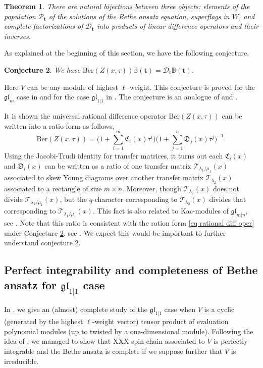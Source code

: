 \documentclass[11pt,reqno]{amsart}
\numberwithin{equation}{section}
\newtheorem{thm}{Theorem}[section]
\newtheorem{conj}[thm]{Conjecture}
\theoremstyle{definition}
\theoremstyle{remark}
\newcommand{\mc}{\mathcal}
\newcommand{\gl}{\mathfrak{gl}}
\newcommand{\la}{\lambda}
\newcommand{\glMN}{\mathfrak{gl}_{m|n}}
\begin{document}
\begin{thm}\cite[Theorem 6.7]{HLM:2019}
There are natural bijections between three objects:
elements of the population $\mc P_{\bm t}$ of the solutions of the Bethe ansatz equation, superflags in $W$, and complete
factorizations of $\mc D_{\bm t}$ into products of linear difference operators and their inverses.
\end{thm}

As explained at the beginning of this section, we have the following conjecture.
\begin{conj}\label{conj oper}
We have $\mathrm{Ber}(Z(x,\tau))\mathbb B(\bm t)=\mc D_{\bm t}\mathbb B(\bm t)$.
\end{conj}

Here $V$ can be any module of highest $\ell$-weight. This conjecture is proved for the $\gl_m$ case in \cite[Theorem 6.1]{MTV:2006} and for the case $\gl_{1|1}$ in \cite[Theorem 6.4]{LM:2019}. The conjecture is an analogue of \cite[Theorem 5.11]{FH:2015} and \cite[Theorem 7.5]{FJMM:2017}.

It is shown \cite[Thm. 5.12]{LM:2020} the universal rational difference operator $\mathrm{Ber}(Z(x,\tau))$ can be written into a ratio form as follows,
\[
\mathrm{Ber}(Z(x,\tau))=\big(1+\sum_{i=1}^m \mathfrak C_i(x)\tau^i\big)\big(1+\sum_{j=1}^n \mathfrak D_j(x)\tau^j\big)^{-1}.
\]
Using the Jacobi-Trudi identity for transfer matrices, it turns out each $\mathfrak C_i(x)$ and $\mathfrak D_i(x)$ can be written as a ratio of one transfer matrix $\mathscr T_{\la_1/\mu_1}(x)$ associated to skew Young diagrams over another transfer matrix $\mathscr T_{\la_2}(x)$ associated to a rectangle of size $m\times n$. Moreover, though $\mathscr T_{\la_2}(x)$ does not divide $\mathscr T_{\la_1/\mu_1}(x)$, but the $q$-character corresponding to $\mathscr T_{\la_2}(x)$ divides that corresponding to $\mathscr T_{\la_1/\mu_1}(x)$. This fact is also related to Kac-modules of $\glMN$, see \cite[Rem. 3.15]{LM:2020}. Note that this ratio is consistent with the ration form \eqref{eq rational diff oper} under Conjecture \ref{conj oper}, see \cite[Sec. 5.5]{LM:2020}. We expect this would be important to further understand conjecture \ref{conj oper}.

\subsection{Perfect integrability and completeness of Bethe ansatz for $\gl_{1|1}$ case} \label{sec XXX frob}
In \cite{LM:2019}, we give an (almost) complete study of the $\gl_{1|1}$ case when $V$ is a cyclic (generated by the highest $\ell$-weight vector) tensor product of evaluation polynomial modules (up to twisted by a one-dimensional module). Following the idea of \cite{MTV:2009b}, we managed to show that XXX spin chain associated to $V$ is perfectly integrable and the Bethe ansatz is complete if we suppose further that $V$ is irreducible.
\end{document}
